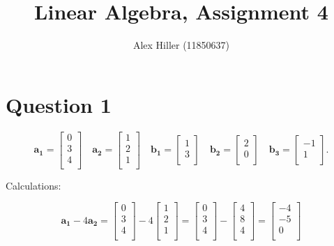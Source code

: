 \documentclass{article}
\author{Alex Hiller (11850637)}
\title{Linear Algebra, Assignment 4}
\begin{document}
\maketitle
\clearpage

\section{Question 1}

\[
    \mathbf{a_1} = 
    \begin{bmatrix}
        0 \\ 
        3 \\ 
        4 \\
    \end{bmatrix}
    \quad 
    \mathbf{a_2} =
    \begin{bmatrix}
        1\\
        2\\
        1\\
    \end{bmatrix}
    \quad
    \mathbf{b_1} = 
    \begin{bmatrix}
        1 \\
        3 \\
    \end{bmatrix}
    \quad 
    \mathbf{b_2} = 
    \begin{bmatrix}
        2 \\
        0 \\
    \end{bmatrix}
    \quad 
    \mathbf{b_3} = 
    \begin{bmatrix}
        -1 \\
        1 \\
    \end{bmatrix}
.\]


Calculations:


\[
    \mathbf{a_1} -
    4 \mathbf{a_2} =
    \begin{bmatrix}
        0 \\ 3 \\ 4 \\
    \end{bmatrix}
    -4
    \begin{bmatrix}
        1\\ 2\\ 1\\
    \end{bmatrix}
    =
    \begin{bmatrix}
        0 \\ 3 \\ 4 \\
    \end{bmatrix}
    -
    \begin{bmatrix}
        4\\ 8\\ 4\\
    \end{bmatrix}
    =
    \begin{bmatrix}
        -4 \\ -5 \\ 0 \\
    \end{bmatrix}
\]
\end{document}
